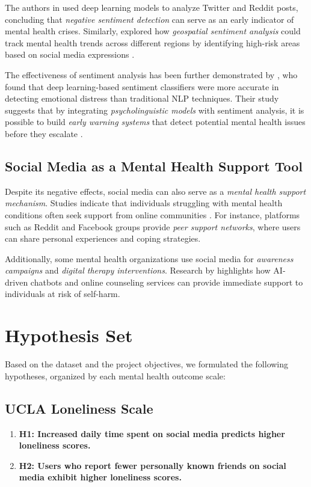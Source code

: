 \documentclass[twocolumn,numbers]{article}
\begin{document}
The authors in \citep{nguyen2021} used deep learning models to analyze Twitter and Reddit posts, concluding that \textit{negative sentiment detection} can serve as an early indicator of mental health crises. Similarly, \cite{gao2020} explored how \textit{geospatial sentiment analysis} could track mental health trends across different regions by identifying high-risk areas based on social media expressions \citep{gao2020}.

The effectiveness of sentiment analysis has been further demonstrated by \citep{morris2021}, who found that deep learning-based sentiment classifiers were more accurate in detecting emotional distress than traditional NLP techniques. Their study suggests that by integrating \textit{psycholinguistic models} with sentiment analysis, it is possible to build \textit{early warning systems} that detect potential mental health issues before they escalate \citep{morris2021}.

\subsection{Social Media as a Mental Health Support Tool}
Despite its negative effects, social media can also serve as a \textit{mental health support mechanism}. Studies indicate that individuals struggling with mental health conditions often seek support from online communities \citep{miller2018}. For instance, platforms such as Reddit and Facebook groups provide \textit{peer support networks}, where users can share personal experiences and coping strategies.

Additionally, some mental health organizations use social media for \textit{awareness campaigns} and \textit{digital therapy interventions}. Research by \cite{nguyen2021} highlights how AI-driven chatbots and online counseling services can provide immediate support to individuals at risk of self-harm.

\section{Hypothesis Set}
Based on the dataset and the project objectives, we formulated the following hypotheses, organized by each mental health outcome scale:

\subsection*{UCLA Loneliness Scale}
\begin{enumerate}
    \item \textbf{H1: Increased daily time spent on social media predicts higher loneliness scores.}
    \item \textbf{H2: Users who report fewer personally known friends on social media exhibit higher loneliness scores.}
\end{enumerate}
\end{document}
